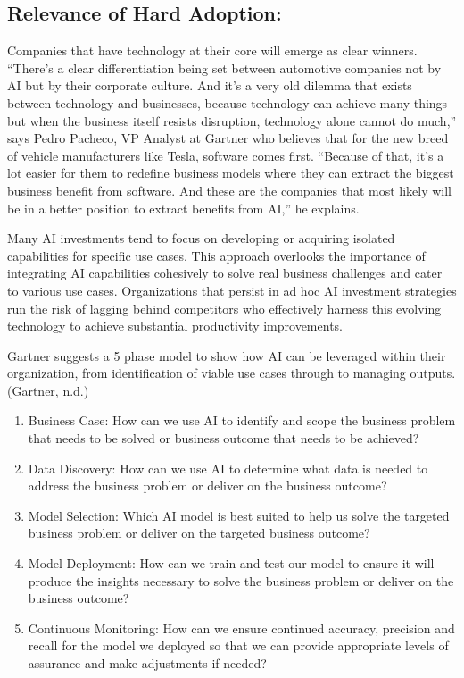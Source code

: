 \documentclass[
]{article}
\providecommand{\tightlist}{%
  \setlength{\itemsep}{0pt}\setlength{\parskip}{0pt}}
\begin{document}
\hypertarget{relevance-of-hard-adoption}{%
\subsection*{Relevance of Hard Adoption:}\label{relevance-of-hard-adoption}}

Companies that have technology at their core will emerge as clear winners. ``There's a clear differentiation being set between automotive companies not by AI but by their corporate culture. And it's a very old dilemma that exists between technology and businesses, because technology can achieve many things but when the business itself resists disruption, technology alone cannot do much,'' says Pedro Pacheco, VP Analyst at Gartner who believes that for the new breed of vehicle manufacturers like Tesla, software comes first. ``Because of that, it's a lot easier for them to redefine business models where they can extract the biggest business benefit from software. And these are the companies that most likely will be in a better position to extract benefits from AI,'' he explains.

Many AI investments tend to focus on developing or acquiring isolated capabilities for specific use cases. This approach overlooks the importance of integrating AI capabilities cohesively to solve real business challenges and cater to various use cases. Organizations that persist in ad hoc AI investment strategies run the risk of lagging behind competitors who effectively harness this evolving technology to achieve substantial productivity improvements.

Gartner suggests a 5 phase model to show how AI can be leveraged within their organization, from identification of viable use cases through to managing outputs. (Gartner, n.d.)

\begin{enumerate}
\def\labelenumi{\arabic{enumi}.}
\tightlist
\item
  Business Case: How can we use AI to identify and scope the business problem that needs to be solved or business outcome that needs to be achieved?
\item
  Data Discovery: How can we use AI to determine what data is needed to address the business problem or deliver on the business outcome?
\item
  Model Selection: Which AI model is best suited to help us solve the targeted business problem or deliver on the targeted business outcome?
\item
  Model Deployment: How can we train and test our model to ensure it will produce the insights necessary to solve the business problem or deliver on the business outcome?
\item
  Continuous Monitoring: How can we ensure continued accuracy, precision and recall for the model we deployed so that we can provide appropriate levels of assurance and make adjustments if needed?
\end{enumerate}
\end{document}
